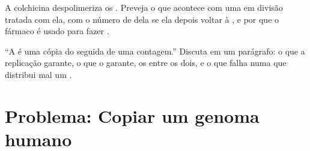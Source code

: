 \begin{exercise}[$\star\star\star$]\label{exo:b1:replication-mitosis:11}
A colchicina despolimeriza os . Preveja o que acontece com
uma  em divisão tratada com ela, com o número de  dela
se ela depois voltar à , e por que o fármaco é usado para fazer
.
\end{exercise}

\begin{exercise}[$\star\star\star$]\label{exo:b1:replication-mitosis:12}
``A  é uma cópia do  seguida de uma contagem.'' Discuta em
um parágrafo: o que a replicação garante, o que o  garante, os
 entre os dois, e o que falha numa  que
distribui mal um .
\end{exercise}

\section{Problema: Copiar um genoma humano}

